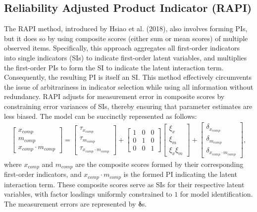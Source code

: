\documentclass[
  man,mask]{apa6}
\begin{document}
\subsection{Reliability Adjusted Product Indicator (RAPI)}\label{reliability-adjusted-product-indicator-rapi}

The RAPI method, introduced by Hsiao et al. (2018), also involves forming PIs, but it does so by using composite scores (either sum or mean scores) of multiple observed items. Specifically, this approach aggregates all first-order indicators into single indicators (SIs) to indicate first-order latent variables, and multiplies the first-order PIs to form the SI to indicate the latent interaction term. Consequently, the resulting PI is itself an SI. This method effectively circumvents the issue of arbitrariness in indicator selection while using all information without redundancy. RAPI adjusts for measurement error in composite scores by constraining error variances of SIs, thereby ensuring that parameter estimates are less biased. The model can be succinctly represented as follows:
\begin{align}
    \begin{bmatrix}
        x_{comp} \\
        m_{comp} \\
        x_{comp} \cdot m_{comp}
    \end{bmatrix} = 
    \begin{bmatrix}
        \tau_{x_{comp}} \\
        \tau_{m_{comp}} \\ 
        \tau_{x_{comp} \cdot m_{comp}} 
    \end{bmatrix} + 
    \begin{bmatrix}
        1 & 0 & 0 \\
        0 & 1 & 0 \\ 
        0 & 0 & 1 
    \end{bmatrix}
    \begin{bmatrix}
        \xi_{x} \\  
        \xi_{m} \\ 
        \xi_{x}\xi_{m}
    \end{bmatrix} +
    \begin{bmatrix}
        \delta_{x_{comp}} \\
        \delta_{m_{comp}} \\ 
        \delta_{x_{comp} \cdot m_{comp}}
    \end{bmatrix},
\end{align}
where \(x_{comp}\) and \(m_{comp}\) are the composite scores formed by their corresponding first-order indicators, and \(x_{comp} \cdot m_{comp}\) is the formed PI indicating the latent interaction term. These composite scores serve as SIs for their respective latent variables, with factor loadings uniformly constrained to \(1\) for model identification. The measurement errors are represented by \(\mathbf{\delta}\)s.
\end{document}
